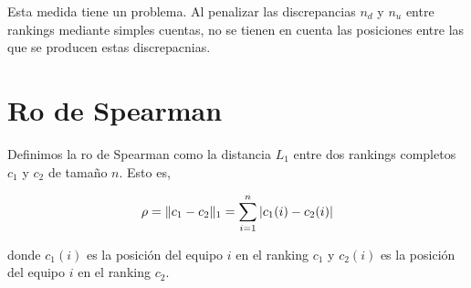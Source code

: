 Esta medida tiene un problema. Al penalizar las discrepancias $n_d$ y $n_u$ entre rankings mediante simples cuentas, no se tienen en cuenta las posiciones entre las que se producen estas discrepacnias.

\section{Ro de Spearman}

\begin{defi}[Ro de Spearman]
Definimos la ro de Spearman como la distancia $L_1$ entre dos rankings completos $c_1$ y $c_2$ de tamaño $n$. Esto es, 

\begin{equation}
\rho = \lVert c_1 - c_2 \rVert_1 = \sum\limits_{i=1}^{n} |c_1(i) - c_2(i)|
\end{equation}

donde $c_1(i)$ es la posición del equipo $i$ en el ranking $c_1$ y $c_2(i)$ es la posición del equipo $i$ en el ranking $c_2$.
\end{defi}

